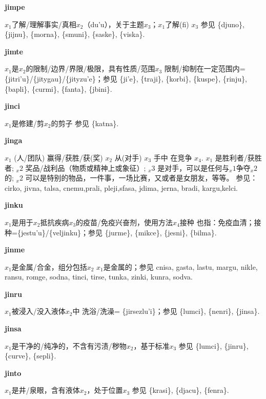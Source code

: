 \documentclass[notitlepage,twocolumn,a4paper,10pt]{book}
\begin{document}
{\sffamily\bfseries jimpe}\enspace {\ttfamily\bfseries[    jmi]}  $x_1$了解\slash{}理解事实\slash{}真相$x_2$（du'u），关于主题$x_3$；$x_1$了解(fi) $x_3$ \textemdash{} 参见 \{djuno\}, \{jijnu\}, \{morna\}, \{smuni\}, \{saske\}, \{viska\}.

{\sffamily\bfseries jimte}\enspace {\ttfamily\bfseries[jit]}  $x_1$是$x_2$的限制\slash{}边界\slash{}界限\slash{}极限，具有性质\slash{}范围$x_3$ \textemdash{} 限制\slash{}抑制在一定范围内= \{jitri'u\}\slash{}\{jitygau\}\slash{}\{jityzu'e\}；参见 \{ji'e\}, \{traji\}, \{korbi\}, \{kuspe\}, \{rinju\}, \{bapli\}, \{curmi\}, \{fanta\}, \{jbini\}.

{\sffamily\bfseries jinci} $x_1$是修建\slash{}剪$x_2$的剪子 \textemdash{} 参见 \{katna\}.

{\sffamily\bfseries jinga}\enspace {\ttfamily\bfseries[jig     ji'a]}  $x_{1}$ (人\slash{}团队) 赢得\slash{}获胜\slash{}获(奖) $x_{2}$ 从(对手) $x_{3}$  手中 在竞争 $x_{4}$. \textemdash{} $x_1$ 是胜利者\slash{}获胜者; $_x2$ 奖品\slash{}战利品（物质或精神上或象征）; $_x3$ 是对手，可以是任何与$_x1$争夺$_x2$的; $_x2$ 可以是特别的物品，一件事，一场比赛，又或者是女朋友，等等。 参见： {cirko}, {jivna}, {talsa}, {cnemu},{prali}, {pleji},{sfasa}, {jdima}, {jerna}, {bradi}, {kargu},{kelci}.

{\sffamily\bfseries jinku} $x_1$是用于$x_2$抵抗疾病$x_3$的疫苗\slash{}免疫兴奋剂，使用方法$x_4$接种 \textemdash{} 也指：免疫血清；接种=\{jestu'u\}\slash{}\{veljinku\}；参见 \{jurme\}, \{mikce\}, \{jesni\}, \{bilma\}.

{\sffamily\bfseries jinme}\enspace {\ttfamily\bfseries[jim]}  $x_1$是金属\slash{}合金，组分包括$x_2$ \textemdash{} $x_1$是金属的；参见 {cnisa}, {gasta}, {lastu}, {margu}, {nikle}, {ransu}, {romge}, {sodna}, {tinci}, {tirse}, {tunka}, {zinki}, {kunra}, {sodva}.

{\sffamily\bfseries jinru}\enspace {\ttfamily\bfseries[jir]}  $x_1$被浸入\slash{}没入液体$x_2$中 \textemdash{} 洗浴\slash{}洗澡= \{jirsezlu'i\}；参见 \{lumci\}, \{nenri\}, \{jinsa\}.

{\sffamily\bfseries jinsa}\enspace {\ttfamily\bfseries[jis]}  $x_1$是干净的\slash{}纯净的，不含有污渍\slash{}秽物$x_2$，基于标准$x_3$ \textemdash{} 参见 \{lumci\}, \{jinru\}, \{curve\}, \{sepli\}.

{\sffamily\bfseries jinto} $x_1$是井\slash{}泉眼，含有液体$x_2$，处于位置$x_3$ \textemdash{} 参见 \{krasi\}, \{djacu\}, \{fenra\}.
\end{document}
